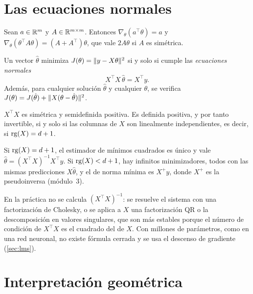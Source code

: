 \section{Las ecuaciones normales}

\begin{lema}\label{lem:gradientes}
Sean $a\in\mathbb{R}^{m}$ y $A\in\mathbb{R}^{m\times m}$. Entonces $\nabla_\theta(a^{\top}\theta)=a$ y $\nabla_\theta(\theta^{\top}A\theta)=(A+A^{\top})\theta$, que vale $2A\theta$ si $A$ es simétrica.
\end{lema}

\begin{teorema}\label{teo:normales}
Un vector $\hat\theta$ minimiza $J(\theta)=\lVert y-X\theta\rVert^{2}$ si y solo si cumple las \emph{ecuaciones normales}
\[
X^{\top}X\,\hat\theta=X^{\top}y.
\]
Además, para cualquier solución $\hat\theta$ y cualquier $\theta$, se verifica $J(\theta)=J(\hat\theta)+\lVert X(\theta-\hat\theta)\rVert^{2}$.
\end{teorema}

\begin{lema}\label{lem:rango}
$X^{\top}X$ es simétrica y semidefinida positiva. Es definida positiva, y por tanto invertible, si y solo si las columnas de $X$ son linealmente independientes, es decir, si $\operatorname{rg}(X)=d+1$.
\end{lema}

\begin{corolario}[Unicidad]\label{cor:unicidad}
Si $\operatorname{rg}(X)=d+1$, el estimador de mínimos cuadrados es único y vale $\hat\theta=(X^{\top}X)^{-1}X^{\top}y$. Si $\operatorname{rg}(X)<d+1$, hay infinitos minimizadores, todos con las mismas predicciones $X\hat\theta$, y el de norma mínima es $X^{+}y$, donde $X^{+}$ es la pseudoinversa (módulo~3).
\end{corolario}

\addtocounter{definicion}{1}%

\begin{observacion}
En la práctica no se calcula $(X^{\top}X)^{-1}$: se resuelve el sistema con una factorización de Cholesky, o se aplica a $X$ una factorización QR o la descomposición en valores singulares, que son más estables porque el número de condición de $X^{\top}X$ es el cuadrado del de $X$. Con millones de parámetros, como en una red neuronal, no existe fórmula cerrada y se usa el descenso de gradiente (\cref{sec:lms}).
\end{observacion}

\section{Interpretación geométrica}

